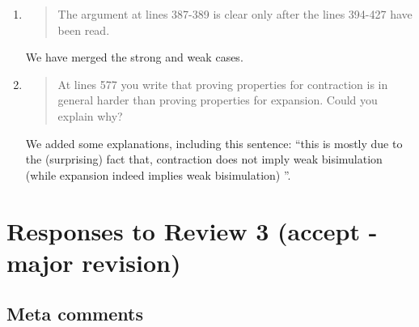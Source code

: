 \begin{enumerate}
\item \begin{quote}
    The argument at lines 387-389 is clear only after the lines 394-427 have been read.
  \end{quote}

  \Mark
  We have merged the strong and weak cases.
  
\item \begin{quote}
    At lines 577 you write that proving properties for contraction is
    in general harder than proving properties for expansion. Could you
    explain why?
  \end{quote}

  \Mark
  We added some explanations, including this sentence:
 ``this is mostly due to the (surprising) fact
 that, contraction does not imply weak bisimulation (while expansion
 indeed implies weak bisimulation) ''.

\end{enumerate}

\section*{Responses to Review 3 (accept - major revision)}

\subsection*{Meta comments}

